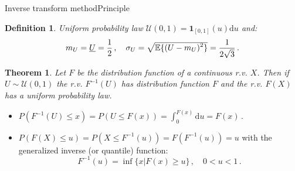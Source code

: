 \documentclass{beamer}
\newcommand{\id}{\mathrm{d}}
\newcommand{\demi}{\frac{1}{2}}
\newcommand{\esp}[1]{\mathbb{E}\{\smash{#1}\}}
\newcommand{\mean}[1]{\underline{#1}}
\newcommand{\Ugj}{U}
\newcommand{\Xgj}{X}
\newcommand{\PDFU}{{\mathcal U}}
\newtheorem{mydef}{Definition}
\newtheorem{mythe}{Theorem}
\begin{document}
\begin{frame}{Inverse transform method}{Principle}

\begin{mydef}
Uniform probability law $\PDFU(0,1)={\mathbf 1}_{[0,1]}(u)\id u$ and:
\begin{displaymath}
m_\Ugj=\mean{\Ugj}=\demi\,,\quad\sigma_\Ugj=\sqrt{\esp{(\Ugj-m_\Ugj)^2}}=\frac{1}{2\sqrt{3}}\,.
\end{displaymath}
\end{mydef}

\begin{mythe}
Let $F$ be the distribution function of a continuous r.v. $X$. 
Then if $\Ugj\sim\PDFU(0,1)$ the r.v. $F^{-1}(\Ugj)$ has distribution function $F$ and the r.v. $F(\Xgj)$ has a uniform probability law.
\end{mythe}
\vspace{-0.2truecm}
\footnotesize{
\begin{itemize}
\item $P(F^{-1}(\Ugj)\leq x)=P(\Ugj\leq F(x))=\int_0^{F(x)}\id u=F(x)$\,.
\item $P(F(\Xgj)\leq u)=P(\Xgj\leq F^{-1}(u))=F(F^{-1}(u))=u$ with the generalized inverse (or quantile) function:
\begin{displaymath}
F^{-1}(u)=\operatorname{inf}\{x|F(x)\geq u\}\,,\quad0<u<1\,.
\end{displaymath}
\end{itemize}
}

\end{frame}
\end{document}
